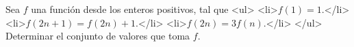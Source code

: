 Sea $f$ una función desde los enteros positivos, tal que 
<ul>
<li>$f(1)=1$.</li>
<li>$f(2n+1)=f(2n)+1$.</li>
<li>$f(2n)=3f(n)$.</li>
</ul>
Determinar el conjunto de valores que toma $f$.